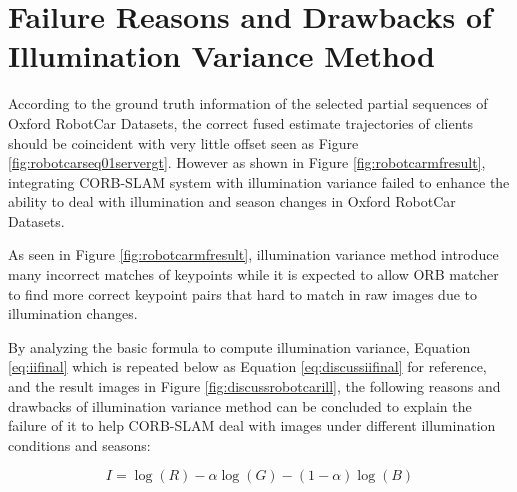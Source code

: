 
\section{Failure Reasons and Drawbacks of Illumination Variance Method}
\label{sec:discusslifelong}

According to the ground truth information of the selected partial sequences of Oxford RobotCar Datasets, the correct fused estimate trajectories of clients should be coincident with very little offset seen as Figure \ref{fig:robotcarseq01servergt}. However as shown in Figure \ref{fig:robotcarmfresult}, integrating CORB-SLAM system with illumination variance failed to enhance the ability to deal with illumination and season changes in Oxford RobotCar Datasets. 

As seen in Figure \ref{fig:robotcarmfresult}, illumination variance method introduce many incorrect matches of keypoints while it is expected to allow ORB matcher to find more correct keypoint pairs that hard to match in raw images due to illumination changes. 

By analyzing the basic formula to compute illumination variance, Equation \ref{eq:iifinal} which is repeated below as Equation \ref{eq:discussiifinal} for reference, and the result images in Figure \ref{fig:discussrobotcarill}, the following reasons and drawbacks of illumination variance method can be concluded to explain the failure of it to help CORB-SLAM deal with images under different illumination conditions and seasons: 

\begin{equation}
I=\log(R)-\alpha\log(G)-(1-\alpha)\log(B)
\label{eq:discussiifinal}
\end{equation}

